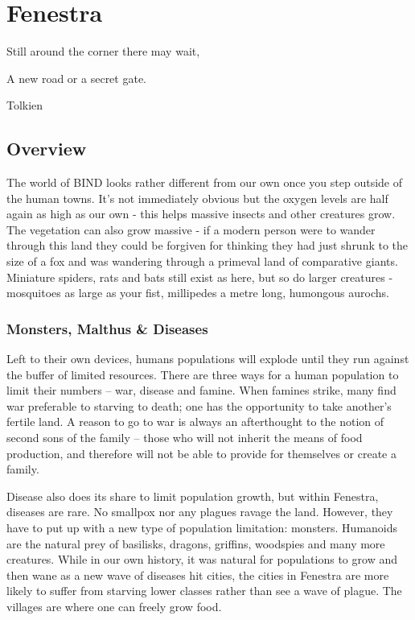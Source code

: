 \chapter{Fenestra}

\epigraph{Still around the corner there may wait,

A new road or a secret gate.}{Tolkien}

\section{Overview}

\begin{multicols}{2}

The world of BIND looks rather different from our own once you step outside of the human towns.
It's not immediately obvious but the oxygen levels are half again as high as our own - this helps massive insects and other creatures grow.
The vegetation can also grow massive - if a modern person were to wander through this land they could be forgiven for thinking they had just shrunk to the size of a fox and was wandering through a primeval land of comparative giants.
Miniature spiders, rats and bats still exist as here, but so do larger creatures  - mosquitoes as large as your fist, millipedes a metre long, humongous aurochs.

\subsection{Monsters, Malthus \& Diseases}

Left to their own devices, humans populations will explode until they run against the buffer of limited resources.  There are three ways for a human population to limit their numbers -- war, disease and famine.  When famines strike, many find war preferable to starving to death; one has the opportunity to take another's fertile land.  A reason to go to war is always an afterthought to the notion of second sons of the family -- those who will not inherit the means of food production, and therefore will not be able to provide for themselves or create a family.

Disease also does its share to limit population growth, but within Fenestra, diseases are rare.  No smallpox nor any plagues ravage the land.  However, they have to put up with a new type of population limitation: monsters.  Humanoids are the natural prey of basilisks, dragons, griffins, woodspies and many more creatures.  While in our own history, it was natural for populations to grow and then wane as a new wave of diseases hit cities, the cities in Fenestra are more likely to suffer from starving lower classes rather than see a wave of plague.  The villages are where one can freely grow food.


\end{multicols}
